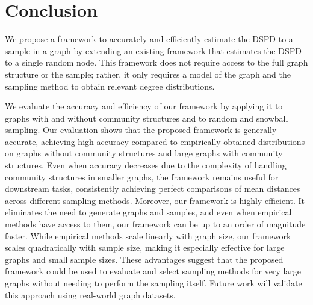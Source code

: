 \section{Conclusion}
\label{sec:conclusion}

We propose a framework to accurately and efficiently estimate the DSPD to a sample in a graph by extending an existing framework that estimates the DSPD to a single random node. This framework does not require access to the full graph structure or the sample; rather, it only requires a model of the graph and the sampling method to obtain relevant degree distributions.

We evaluate the accuracy and efficiency of our framework by applying it to graphs with and without community structures and to random and snowball sampling. Our evaluation shows that the proposed framework is generally accurate, achieving high accuracy compared to empirically obtained distributions on graphs without community structures and large graphs with community structures. Even when accuracy decreases due to the complexity of handling community structures in smaller graphs, the framework remains useful for downstream tasks, consistently achieving perfect comparisons of mean distances across different sampling methods. Moreover, our framework is highly efficient. It eliminates the need to generate graphs and samples, and even when empirical methods have access to them, our framework can be up to an order of magnitude faster. While empirical methods scale linearly with graph size, our framework scales quadratically with sample size, making it especially effective for large graphs and small sample sizes. These advantages suggest that the proposed framework could be used to evaluate and select sampling methods for very large graphs without needing to perform the sampling itself. Future work will validate this approach using real-world graph datasets.
